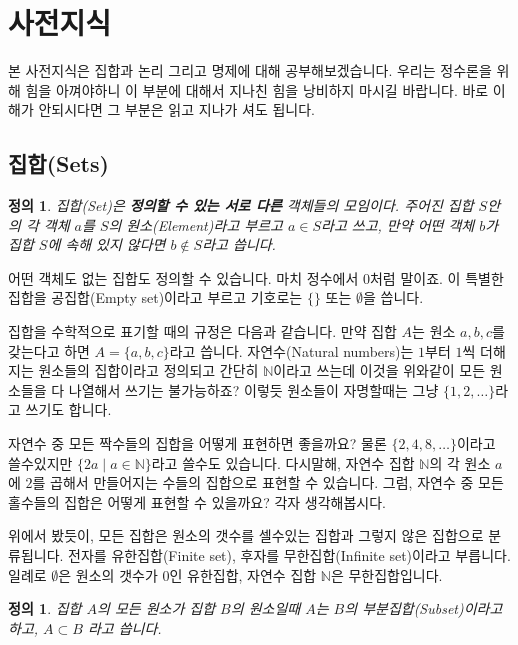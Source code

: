 \documentclass[a4paper, 11pt]{report}
\renewcommand{\<}{\langle}
\renewcommand{\>}{\rangle}
\newtheorem{dfn}[thm]{정의}
\begin{document}
\section{사전지식}

본 사전지식은 집합과 논리 그리고 명제에 대해 공부해보겠습니다. 우리는 정수론을 위해 힘을 아껴야하니
이 부분에 대해서 지나친 힘을 낭비하지 마시길 바랍니다. 바로 이해가 안되시다면 그 부분은 읽고 지나가
셔도 됩니다.

\subsection{집합(Sets)}

\begin{dfn}
집합(Set)은 \textbf{정의할 수 있는 서로 다른} 객체들의 모임이다. 주어진 집합 $S$안의 각 객체 $a$를 
$S$의 원소(Element)라고 부르고 $a \in S$라고 쓰고, 만약 어떤 객체 $b$가 집합 $S$에 속해
있지 않다면 $b \not\in S$라고 씁니다.
\end{dfn}

어떤 객체도 없는 집합도 정의할 수 있습니다. 마치 정수에서 $0$처럼 말이죠. 이 특별한 
집합을 공집합(Empty set)이라고 부르고 기호로는 $\{\}$ 또는 $\emptyset$을 씁니다.

집합을 수학적으로 표기할 때의 규정은 다음과 같습니다. 만약 집합 $A$는 원소 $a, b, c$를 갖는다고 
하면 $A = \{a, b, c\}$라고 씁니다. 자연수(Natural numbers)는 $1$부터 $1$씩 더해지는 원소들의 
집합이라고 정의되고 간단히 $\mathbb{N}$이라고 쓰는데 이것을 위와같이 모든 원소들을 다 나열해서 
쓰기는 불가능하죠? 이렇듯 원소들이 자명할때는 그냥 $\{1, 2, \ldots\}$라고 쓰기도 합니다.

자연수 중 모든 짝수들의 집합을 어떻게 표현하면 좋을까요? 물론 $\{2, 4, 8, \ldots\}$이라고 
쓸수있지만 $\{2a \mid a \in \mathbb{N}\}$라고 쓸수도 있습니다. 다시말해, 자연수 집합 
$\mathbb{N}$의 각 원소 $a$에 $2$를 곱해서 만들어지는 수들의 집합으로 표현할 수 있습니다.
그럼, 자연수 중 모든 홀수들의 집합은 어떻게 표현할 수 있을까요? 각자 생각해봅시다.

위에서 봤듯이, 모든 집합은 원소의 갯수를 셀수있는 집합과 그렇지 않은 집합으로 분류됩니다. 전자를 
유한집합(Finite set), 후자를 무한집합(Infinite set)이라고 부릅니다. 일례로 $\emptyset$은 
원소의 갯수가 $0$인 유한집합, 자연수 집합 $\mathbb{N}$은 무한집합입니다.

\begin{dfn}
  집합 $A$의 모든 원소가 집합 $B$의 원소일때 $A$는 $B$의 부분집합(Subset)이라고 하고, $A \subset B$
  라고 씁니다.
\end{dfn}
\end{document}
